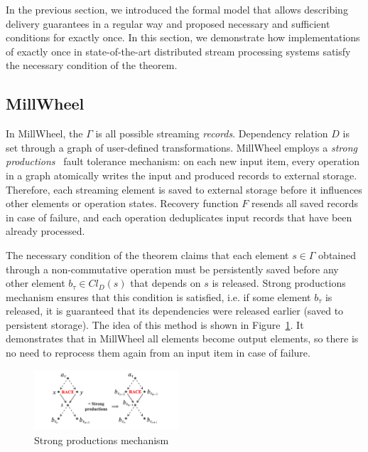 \label{fs-eo-impl}

In the previous section, we introduced the formal model that allows describing delivery guarantees in a regular way and proposed necessary and sufficient conditions for exactly once. In this section, we demonstrate how implementations of exactly once in state-of-the-art distributed stream processing systems satisfy the necessary condition of the theorem. 

\subsection{MillWheel}

In MillWheel, the $\Gamma$ is all possible streaming {\em records}. Dependency relation $D$ is set through a graph of user-defined transformations. MillWheel employs a {\em strong productions}~\cite{Akidau:2013:MFS:2536222.2536229} fault tolerance mechanism: on each new input item, every operation in a graph atomically writes the input and produced records to external storage. Therefore, each streaming element is saved to external storage before it influences other elements or operation states. Recovery function $F$ resends all saved records in case of failure, and each operation deduplicates input records that have been already processed.

The necessary condition of the theorem claims that each element $s \in \Gamma$ obtained through a non-commutative operation must be persistently saved before any other element $b_{\tau} \in Cl_D(s)$ that depends on $s$ is released. Strong productions mechanism ensures that this condition is satisfied, i.e. if some element $b_\tau$ is released, it is guaranteed that its dependencies were released earlier (saved to persistent storage). The idea of this method is shown in Figure~\ref{millwheel}. It demonstrates that in MillWheel all elements become output elements, so there is no need to reprocess them again from an input item in case of failure. 

\begin{figure}[htbp]
  \centering
  \includegraphics[width=0.48\textwidth]{pics/millwheel}
  \caption{Strong productions mechanism}
  \label{millwheel}
\end{figure}

